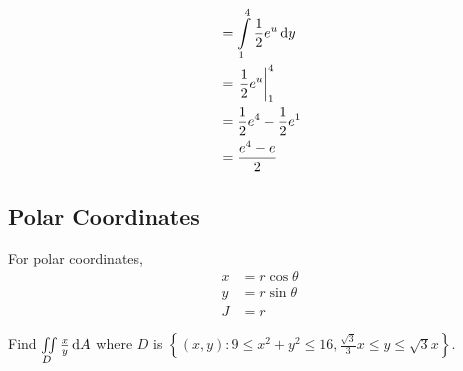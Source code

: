 \documentclass[fleqn, a4paper, 12pt, twoside]{article}
\theoremstyle{definition}
\theoremstyle{theorem}
\begin{document}
\begin{solution}
\begin{align*}
                                                                              & = \int\limits_{1}^{4} \frac{1}{2} e^u \dif y                                      \\
                                                                              & = \left. \frac{1}{2} e^u \right|_{1}^{4}                                          \\
                                                                              & = \frac{1}{2} e^4 - \frac{1}{2} e^1                                               \\
                                                                              & = \frac{e^4 - e}{2}
	\end{align*}
\end{solution}

\subsection{Polar Coordinates}

For polar coordinates,
\begin{align*}
	x & = r \cos \theta \\
	y & = r \sin \theta \\
	J & = r
\end{align*}

\begin{question}
	Find $\iint\limits_{D} \frac{x}{y} \dif A$ where $D$ is $\left\{ (x,y) : 9 \le x^2 + y^2 \le 16 , \frac{\sqrt{3}}{3} x \le y \le \sqrt{3} x \right\}$.
\end{question}
\end{document}
